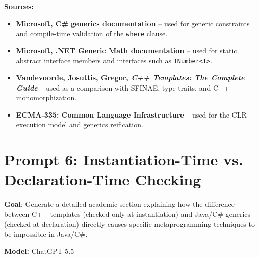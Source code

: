 \documentclass[11pt]{report}
\begin{document}
\noindent\textbf{Sources:}
\begin{itemize}
\item \textbf{Microsoft, C\# generics documentation} \cite{dotnetgenerics} -- used for generic constraints and compile-time validation of the \texttt{where} clause.
\item \textbf{Microsoft, .NET Generic Math documentation} \cite{dotnetgenericmath} -- used for static abstract interface members and interfaces such as \texttt{INumber<T>}.
\item \textbf{Vandevoorde, Josuttis, Gregor, \emph{C++ Templates: The Complete Guide}} \cite{cpp_templates2017} -- used as a comparison with SFINAE, type traits, and C++ monomorphization.
\item \textbf{ECMA-335: Common Language Infrastructure} \cite{ecma335_2024} -- used for the CLR execution model and generics reification.
\end{itemize}

\section{Prompt 6: Instantiation-Time vs. Declaration-Time Checking}

\noindent\textbf{Goal}: Generate a detailed academic section explaining how the difference between C++ templates (checked only at instantiation) and Java/C\# generics (checked at declaration) directly causes specific metaprogramming techniques to be impossible in Java/C\#.

\noindent\textbf{Model:} ChatGPT-5.5
\end{document}
